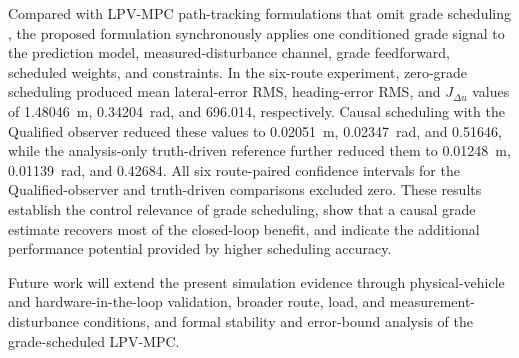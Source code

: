 \documentclass{ieeeaccess}
\newcommand{\citep}[1]{\cite{#1}}
\begin{document}
Compared with LPV-MPC path-tracking formulations that omit grade scheduling
\citep{Alcala2020AutonomousRacingLPVMPC,
Tian2022GainScheduledLPVMPC,Cheng2021VelocityVaryingMPC}, the proposed
formulation synchronously applies one conditioned grade signal to the prediction
model, measured-disturbance channel, grade feedforward, scheduled weights, and
constraints. In the six-route experiment, zero-grade scheduling produced mean
lateral-error RMS, heading-error RMS, and $J_{\Delta u}$ values of 1.48046~m,
0.34204~rad, and 696.014, respectively. Causal scheduling with the Qualified
observer reduced these values to 0.02051~m, 0.02347~rad, and 0.51646, while the
analysis-only truth-driven reference further reduced them to 0.01248~m,
0.01139~rad, and 0.42684. All six route-paired confidence intervals for the
Qualified-observer and truth-driven comparisons excluded zero. These results
establish the control relevance of grade scheduling, show that a causal grade
estimate recovers most of the closed-loop benefit, and indicate the additional
performance potential provided by higher scheduling accuracy.

Future work will extend the present simulation evidence through physical-vehicle
and hardware-in-the-loop validation, broader route, load, and measurement-
disturbance conditions, and formal stability and error-bound analysis of the
grade-scheduled LPV-MPC.

\FloatBarrier
\balance




\EOD
\end{document}

